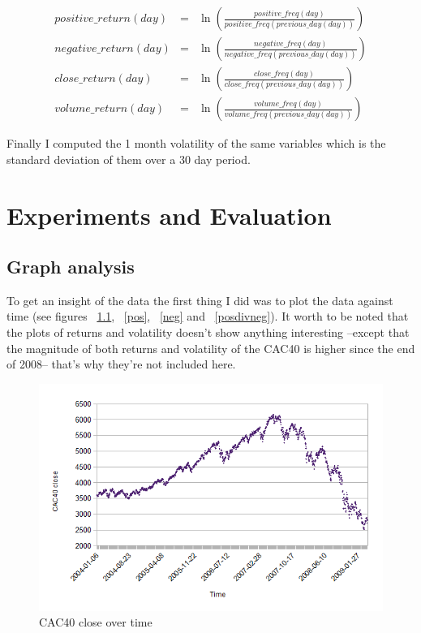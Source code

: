 \documentclass[12pt]{report}
\begin{document}
			\begin{eqnarray}
				positive\_return(day) &=& \ln\left(\frac{positive\_freq(day)}{positive\_freq(previous\_day(day))}\right)\label{preturn}\\
				negative\_return(day) &=& \ln\left(\frac{negative\_freq(day)}{negative\_freq(previous\_day(day))}\right)\label{nreturn}\\
				close\_return(day) &=& \ln\left(\frac{close\_freq(day)}{close\_freq(previous\_day(day))}\right)\label{creturn}\\
				volume\_return(day) &=& \ln\left(\frac{volume\_freq(day)}{volume\_freq(previous\_day(day))}\right)\label{vreturn}
			\end{eqnarray}
			
			Finally I computed the 1 month volatility of the same variables which is the standard deviation of them over a 30 day period.
			
	\chapter{Experiments and Evaluation}
		\section{Graph analysis}
		
			To get an insight of the data the first thing I did was to plot the data against time (see figures ~\ref{cac}, ~\ref{pos}, ~\ref{neg} and ~\ref{posdivneg}). It worth to be noted that the plots of returns and volatility doesn't show anything interesting --except that the magnitude of both returns and volatility of the CAC40 is higher since the end of 2008-- that's why they're not included here.

			\begin{figure}[h]
				\caption{CAC40 close over time\label{cac}}
				\includegraphics{plots/time/cac.png}
			\end{figure}
\end{document}
